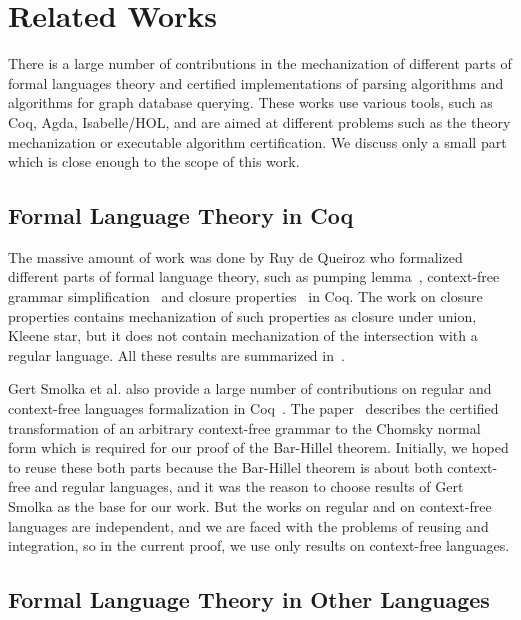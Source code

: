 \section{Related Works}
\label{sec:rel-work}

There is a large number of contributions in the mechanization of different parts of formal languages theory and certified implementations of parsing algorithms and algorithms for graph database querying.
These works use various tools, such as Coq, Agda, Isabelle/HOL, and are aimed at different problems such as the theory mechanization or executable algorithm certification.
We discuss only a small part which is close enough to the scope of this work.

\subsection{Formal Language Theory in Coq}

The massive amount of work was done by Ruy de Queiroz who formalized different parts of formal language theory, such as pumping lemma~\cite{ramos2015formalizationPumping}, context-free grammar simplification~\cite{ramos2015formalization} and closure properties~\cite{ramos2015formalizationClosure} in Coq.
The work on closure properties contains mechanization of such properties as closure under union, Kleene star, but it does not contain mechanization of the intersection with a regular language.
All these results are summarized in~\cite{ramos2016formalization}.

Gert Smolka et al. also provide a large number of contributions on regular and context-free languages formalization in Coq~\cite{smolka2017regular,smolka2013regular,kaiser2012constructive,smolkaHofmann2016}.
The paper~\cite{smolkaHofmann2016} describes the certified transformation of an arbitrary context-free grammar to the Chomsky normal form which is required for our proof of the Bar-Hillel theorem.
Initially, we hoped to reuse these both parts because the Bar-Hillel theorem is about both context-free and regular languages, and it was the reason to choose results of Gert Smolka as the base for our work.
But the works on regular and on context-free languages are independent, and we are faced with the problems of reusing and integration, so in the current proof, we use only results on context-free languages.

\subsection{Formal Language Theory in Other Languages}

